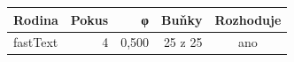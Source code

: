 \begin{tabular}{lrrrc}
\toprule
Rodina & Pokus & φ & Buňky & Rozhoduje\\
\midrule
fastText & 4 & 0,500 & 25 z 25 & ano\\
\bottomrule
\end{tabular}

